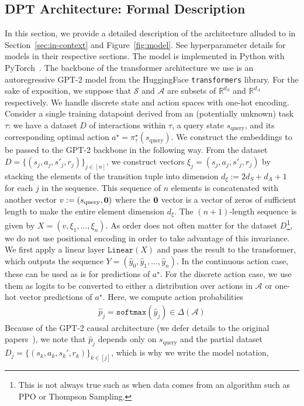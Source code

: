 \documentclass{article}
\newcommand{\Acal}{\mathcal{A}}
\newcommand{\Scal}{{\mathcal{S}}}
\newcommand{\RR}{\mathbb{R}}
\newcommand*{\zero}{{\bf 0}}
\newcommand{\squery}{s_{\text{query}}}
\newcommand{\pistar}{\pi^{\star}}
\begin{document}
\subsection{DPT Architecture: Formal Description}
\label{app:implementation}
In this section, we provide a detailed description of the architecture alluded to in Section~\ref{sec:in-context} and Figure~\ref{fig:model}. See hyperparameter details for models in their respective sections. The model is implemented in Python with PyTorch~\citep{paszke2019pytorch}. The backbone of the transformer architecture we use is an autoregressive GPT-2 model from the HuggingFace \texttt{transformers} library.
For the sake of exposition, we suppose that $\Scal$ and $\Acal$ are subsets of $\RR^{d_S}$ and $\RR^{d_A}$ respectively. We handle discrete state and action spaces with one-hot encoding. Consider a single training datapoint derived from an (potentially unknown) task $\tau$: we have a dataset $D$ of interactions within $\tau$, a query state $\squery$, and its corresponding optimal action $a^\star = \pistar_\tau(\squery)$.
We construct the embeddings to be passed to the GPT-2 backbone in the following way. From the dataset $D = \{ (s_j, a_j, s'_j, r_j) \}_{j \in [n]}$, we construct vectors $\xi_j = (s_j, a_j, s'_j, r_j)$ by stacking the elements of the transition tuple into dimension $d_{\xi} := 2d_S + d_A + 1$ for each $j$ in the sequence. This sequence of $n$ elements is concatenated with another vector $v := (\squery, \zero)$ where the $\zero$ vector is a vector of zeros of sufficient length to make the entire element dimension $d_{\xi}$. The $(n+1)$-length sequence is given by $X = (v, \xi_1, \ldots, \xi_n)$. As order does not often matter for the dataset $D$\footnote{This is not always true such as when data comes from an algorithm such as PPO or Thompson Sampling.}, we do not use positional encoding in order to take advantage of this invariance.
We first apply a linear layer $\texttt{Linear}(X)$ and pass the result to the transformer, which outputs the sequence $Y = (\hat y_0, \hat y_1, \ldots, \hat y_n)$.  In the continuous action case, these can be used as is for predictions of $a^\star$. For the discrete action case, we use them as logits to be converted to either a distribution over actions in $\Acal$ or one-hot vector predictions of $a^\star$. Here, we compute action probabilities
\begin{align}
    \hat p_j = \texttt{softmax}(\hat y_j) \in \Delta(\Acal)
\end{align}
Because of the GPT-2 causal architecture (we defer details to the original papers~\citep{radford2019language,brown2020language}), we note that $\hat p_j$ depends only on $\squery$ and the partial dataset $D_{j} = \{(s_k, a_k, s_k', r_k)\}_{k \in [j]}$, which is why we write the model notation,
\end{document}
